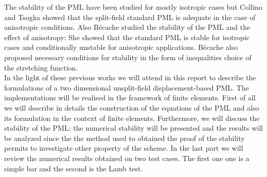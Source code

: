 The stability of the PML have been studied for mostly isotropic cases but Collino and Tsogka \cite{Collino} showed that the split-field standard PML is adequate in the case of anisotropic conditions. Also Bécache \cite{Becache} studied the stability of the PML and the effect of anisotropy: She showed that the standard PML is stable for isotropic cases and conditionally unstable for anisotropic applications. Bécache also proposed necessary conditions for stability in the form of inequalities choice of the stretching function.\\
In the light of these previous works we will attend in this report to describe the formulations of a two dimensional unsplit-field displacement-based PML. The implementations will be realised in the framework of finite elements. First of all we will describe in details the construction of the equations of the PML and also its formulation in the context of finite elements. Furthermore, we will discuss the stability of the PML: the numerical stability will be presented and the results will be analyzed since the the method used to obtained the proof of the stability permits to investigate other property of the scheme. In the last part we will review the numerical results obtained on two test cases. The first one one is a simple bar and the second is the Lamb test.














